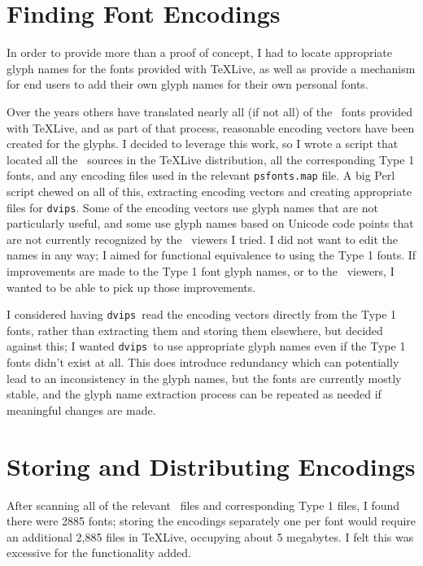\documentclass{ltugboat}
\def\PDF{\acro{PDF}}
\def\dvips{\texttt{dvips}}
\begin{document}
\section{Finding Font Encodings}

In order to provide more than a proof of concept, I had to
locate appropriate glyph names for the fonts provided with
\TeX Live, as well as provide a mechanism for end users to add their
own glyph names for their own personal fonts.

Over the years others have translated nearly all (if not all)
of the \MF\ fonts
provided with \TeX Live,
and as part of that process, reasonable
encoding vectors have been created for the glyphs.  I
decided to leverage this work, so I wrote a
script that located all the \MF\ sources in the \TeX Live
distribution, all the corresponding Type 1 fonts, and any
encoding files used in the relevant \texttt{psfonts.map}
file.  A big Perl script chewed on all of this, extracting
encoding vectors and creating appropriate files for
\dvips.  Some of
the encoding vectors use glyph names that are not particularly
useful, and some use glyph names based on Unicode code
points that are not currently recognized by the \PDF\ viewers
I tried.  I did not want to edit the names in any way;
I aimed for functional equivalence to using the Type 1
fonts.  If improvements are made to the Type 1 font glyph
names, or to the \PDF\ viewers, I wanted to be able to pick
up those improvements.

I considered having \dvips\ read the encoding vectors
directly from the Type 1 fonts, rather than extracting them
and storing them elsewhere, but decided against this; I wanted
\dvips\ to use appropriate glyph names even if the Type 1
fonts didn't exist at all.  This does introduce
redundancy which can potentially lead to an inconsistency in
the glyph names, but the fonts are currently mostly stable, and
the glyph name extraction process can be
repeated as needed if meaningful changes are made.

\section{Storing and Distributing Encodings}

After scanning all of the relevant \MF\ files and corresponding
Type 1 files, I found there were 2885 fonts; storing the
encodings separately one per font would require an additional
2,885 files in \TeX Live, occupying about 5 megabytes.  I felt
this was excessive for the functionality added.
\end{document}
